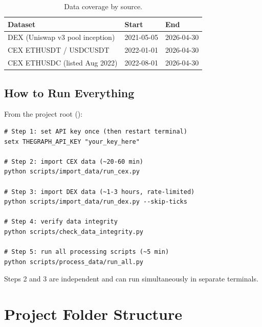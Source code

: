 \documentclass[11pt,a4paper]{article}
\begin{document}
\begin{table}[H]
\centering
\small
\begin{tabular}{lll}
\toprule
\textbf{Dataset} & \textbf{Start} & \textbf{End} \\
\midrule
DEX (Uniswap v3 pool inception) & 2021-05-05 & 2026-04-30 \\
CEX ETHUSDT / USDCUSDT         & 2022-01-01 & 2026-04-30 \\
CEX ETHUSDC (listed Aug 2022)  & 2022-08-01 & 2026-04-30 \\
\bottomrule
\end{tabular}
\caption{Data coverage by source.}
\end{table}

\subsection{How to Run Everything}

From the project root ():

\begin{lstlisting}
# Step 1: set API key once (then restart terminal)
setx THEGRAPH_API_KEY "your_key_here"

# Step 2: import CEX data (~20-60 min)
python scripts/import_data/run_cex.py

# Step 3: import DEX data (~1-3 hours, rate-limited)
python scripts/import_data/run_dex.py --skip-ticks

# Step 4: verify data integrity
python scripts/check_data_integrity.py

# Step 5: run all processing scripts (~5 min)
python scripts/process_data/run_all.py
\end{lstlisting}

Steps 2 and 3 are independent and can run simultaneously in separate terminals.

\section{Project Folder Structure}
\end{document}
